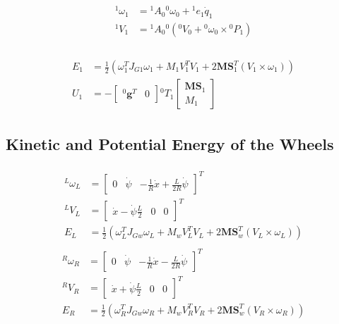 \documentclass[a4paper,10pt]{article}
\begin{document}
\begin{align} \begin{split}
 {}^1\omega_1 &= {}^1A_0{}^0\omega_0+{}^1e_1\dot{q}_1 \\
 {}^1V_1 &= {}^1A_0{}^0\left({}^0V_0+{}^0\omega_0\times {}^0P_1\right) \\
\end{split} \end{align}

\begin{align} \begin{split}
 E_1 &= \frac{1}{2}\left(\omega_1^TJ_{G1}\omega_1+M_1V_1^TV_1+2\mathbf{MS}_1^T(V_1\times\omega_1)\right) \\
 U_1 &= -\left[\begin{matrix}{}^0\mathbf{g}^T & 0 \end{matrix} \right]{}^0T_1\left[\begin{matrix}\mathbf{MS}_1 \\ M_1 \end{matrix} \right]
\end{split}\end{align}

\subsection{Kinetic and Potential Energy of the Wheels}
\begin{align} \begin{split}
 {}^L\omega_L &= \left[\begin{matrix} 0 & \dot{\psi} & -\frac{1}{R}\dot{x}+\frac{L}{2R}\dot{\psi} \end{matrix}\right]^T \\
 {}^LV_L &= \left[\begin{matrix} \dot{x}-\dot{\psi}\frac{L}{2} & 0 & 0 \end{matrix}\right]^T \\
 E_L &= \frac{1}{2}\left(\omega_L^TJ_{Gw}\omega_L+M_wV_L^TV_L+2\mathbf{MS}_w^T(V_L\times\omega_L)\right) 
\end{split}\end{align}
\begin{align} \begin{split}
 {}^R\omega_R &= \left[\begin{matrix} 0 & \dot{\psi} & -\frac{1}{R}\dot{x}-\frac{L}{2R}\dot{\psi} \end{matrix}\right]^T \\
 {}^RV_R &= \left[\begin{matrix} \dot{x}+\dot{\psi}\frac{L}{2} & 0 & 0 \end{matrix}\right]^T \\
 E_R &= \frac{1}{2}\left(\omega_R^TJ_{Gw}\omega_R+M_wV_R^TV_R+2\mathbf{MS}_w^T(V_R\times\omega_R)\right) 
\end{split}\end{align}
\end{document}

